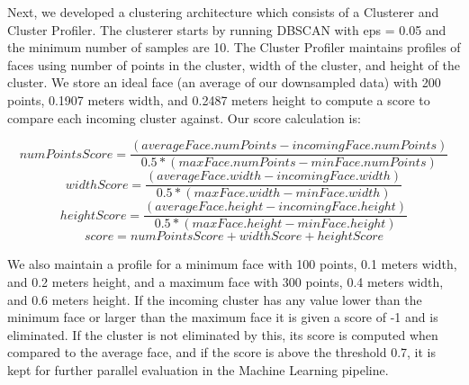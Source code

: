 \documentclass{article}
\begin{document}
Next, we developed a clustering architecture which consists of a Clusterer and Cluster Profiler. The clusterer starts by running DBSCAN with eps = 0.05 and the minimum number of samples are 10. The Cluster Profiler maintains profiles of faces using number of points in the cluster, width of the cluster, and height of the cluster. We store an ideal face (an average of our downsampled data) with 200 points, 0.1907 meters width, and 0.2487 meters height to compute a score to compare each incoming cluster against. Our score calculation is:

\[
    numPointsScore= \frac{(averageFace.numPoints - incomingFace.numPoints)}{0.5 * (maxFace.numPoints - minFace.numPoints)}
\]
\[
    widthScore= \frac{(averageFace.width - incomingFace.width)}{0.5 * (maxFace.width - minFace.width)}
\]
\[
    heightScore= \frac{(averageFace.height - incomingFace.height)}{0.5 * (maxFace.height - minFace.height)}
\]
\[
    score = numPointsScore + widthScore + heightScore
\]

We also maintain a profile for a minimum face with 100 points, 0.1 meters width, and 0.2 meters height, and a maximum face with 300 points, 0.4 meters width, and 0.6 meters height. If the incoming cluster has any value lower than the minimum face or larger than the maximum face it is given a score of -1 and is eliminated. If the cluster is not eliminated by this, its score is computed when compared to the average face, and if the score is above the threshold 0.7, it is kept for further parallel evaluation in the Machine Learning pipeline. 
\end{document}
